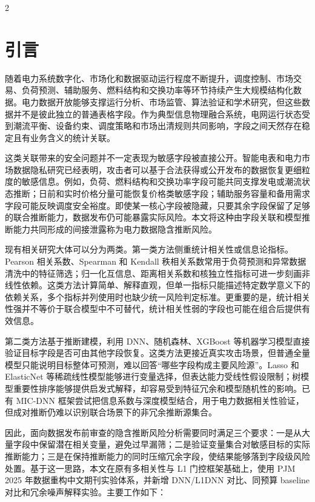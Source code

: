 \documentclass[UTF8,zihao=5,twoside]{ctexart}
\numberwithin{equation}{section}
\begin{document}
\begin{multicols}{2}

\section{引言}
随着电力系统数字化、市场化和数据驱动运行程度不断提升，调度控制、市场交易、负荷预测、辅助服务、燃料结构和交换功率等环节持续产生大规模结构化数据。电力数据开放能够支撑运行分析、市场监管、算法验证和学术研究，但这些数据并不是彼此独立的普通表格字段。作为典型信息物理融合系统，电网运行状态受到潮流平衡、设备约束、调度策略和市场出清规则共同影响，字段之间天然存在稳定且有业务含义的统计关联\cite{ref-liu-cps,ref-ma-pjm,ref-fan-pjm}。

这类关联带来的安全问题并不一定表现为敏感字段被直接公开。智能电表和电力市场数据隐私研究已经表明，攻击者可以基于合法获得或公开发布的数据恢复更细粒度的敏感信息\cite{ref-sankar,ref-giaconi,ref-adewole}。例如，负荷、燃料结构和交换功率字段可能共同支撑发电或潮流状态推断；日前和实时价格分量可能恢复价格类敏感字段；辅助服务容量和备用需求字段可能反映调度安全裕度。即使某一核心字段被隐藏，只要其余字段保留了足够的联合推断能力，数据发布仍可能暴露实际风险。本文将这种由字段关联和模型推断能力共同形成的间接泄露称为电力数据隐含推断风险。

现有相关研究大体可以分为两类。第一类方法侧重统计相关性或信息论指标。Pearson 相关系数、Spearman 和 Kendall 秩相关系数常用于负荷预测和异常数据清洗中的特征筛选\cite{ref-lan-load,ref-jiao-pv,ref-deng-load}；归一化互信息、距离相关系数和核独立性指标可进一步刻画非线性依赖\cite{ref-szekely-dcorr,ref-gretton-hsic}。这类方法计算简单、解释直观，但单一指标只能描述特定数学意义下的依赖关系，多个指标并列使用时也缺少统一风险判定标准。更重要的是，统计相关性强并不等价于联合模型中不可替代，统计相关性弱的字段也可能在组合后提供有效信息。

第二类方法基于推断建模，利用 DNN、随机森林、XGBoost 等机器学习模型直接验证目标字段是否可由其他字段恢复\cite{ref-wang-meter,ref-breiman-rf,ref-chen-xgboost}。这类方法更接近真实攻击场景，但普通全量模型只能说明目标整体可预测，难以回答“哪些字段构成主要风险源”。Lasso 和 ElasticNet 等稀疏线性模型能够进行变量选择\cite{ref-tibshirani-lasso,ref-zou-enet}，但表达能力受线性假设限制；树模型重要性排序能够提供启发式解释，却容易受到特征冗余和模型随机性的影响。已有 MIC-DNN 框架尝试把信息系数与深度模型结合，用于电力数据相关性验证\cite{ref-xing-micdnn}，但成对推断仍难以识别联合场景下的非冗余推断源集合。

因此，面向数据发布前审查的隐含推断风险分析需要同时满足三个要求：一是从大量字段中保留潜在相关变量，避免过早漏筛；二是验证变量集合对敏感目标的实际推断能力；三是在保持推断能力的同时压缩冗余字段，使结果能够落到字段级风险处置。基于这一思路，本文在原有多相关性与 L1 门控框架基础上，使用 PJM 2025 年数据重构中文期刊实验体系，并新增 DNN/L1DNN 对比、同预算 baseline 对比和冗余噪声解释实验。主要工作如下：


\end{multicols}
\end{document}
